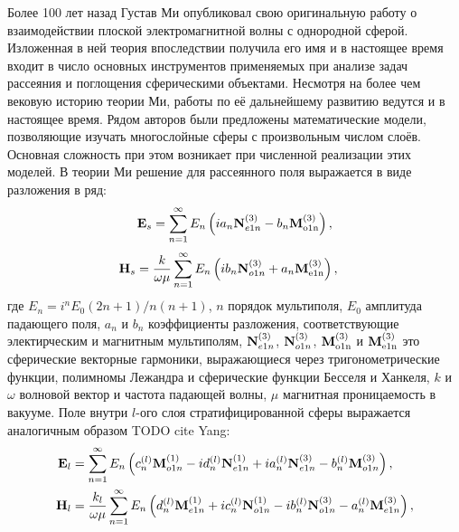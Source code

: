 Более 100 лет назад Густав Ми опубликовал свою оригинальную работу о
взаимодействии плоской электромагнитной волны с однородной сферой.
Изложенная в ней теория впоследствии получила его имя и в настоящее
время входит в число основных инструментов применяемых при анализе
задач рассеяния и поглощения сферическими объектами.  Несмотря на
более чем вековую историю теории Ми, работы по её дальнейшему развитию
ведутся и в настоящее время.  Рядом авторов были предложены
математические модели, позволяющие изучать многослойные сферы с
произвольным числом слоёв.  Основная сложность при этом возникает при
численной реализации этих моделей.  В теории Ми решение для
рассеянного поля выражается в виде разложения в ряд:
\begin{align*}
{\rm \mathbf{E}}_s &=\sum_{n=1}^{\infty} E_n \left( i a_n {\rm
    \mathbf{N}}_{e1n}^{(3)} - b_n{\rm\mathbf{M}_{o1n}^{(3)}} \right),\\
\end{align*}
\begin{align*}
{\rm \mathbf{H}}_s &=\frac{k}{\omega\mu}
 \sum_{n=1}^{\infty} E_n \left( i b_n {\rm
    \mathbf{N}}_{o1n}^{(3)} + a_n{\rm\mathbf{M}_{e1n}^{(3)}} \right),  
\end{align*}
где $E_n=i^nE_0(2n+1)/n(n+1)$, $n$ порядок мультиполя, $E_0$ амплитуда
падающего поля, $a_n$ и $b_n$ коэффициенты разложения, соответствующие
электирческим и магнитным мультиполям, ${\rm \mathbf{N}}_{e1n}^{(3)}$,
${\rm \mathbf{N}}_{o1n}^{(3)}$, ${\rm\mathbf{M}_{o1n}^{(3)}}$ и
${\rm\mathbf{M}_{e1n}^{(3)}}$ это сферические векторные гармоники,
выражающиеся через тригонометрические функции, полимномы Лежандра и
сферические функции Бесселя и Ханкеля, $k$ и $\omega$ волновой вектор
и частота падающей волны, $\mu$ магнитная проницаемость в вакууме.
Поле внутри $l$-ого слоя стратифицированной сферы выражается
аналогичным образом TODO cite Yang:
\begin{align*}
{\rm \mathbf{E}}_l &=\sum_{n=1}^{\infty} E_n \left(
                     c_n^{(l)}{\rm\mathbf{M}}_{o1n}^{(1)}
                     -i d_n^{(l)} {\rm \mathbf{N}}_{e1n}^{(1)}
                     +i a_n^{(l)} {\rm \mathbf{N}}_{e1n}^{(3)}
                     - b_n^{(l)}{\rm\mathbf{M}}_{o1n}^{(3)} 
                     \right),\\
{\rm \mathbf{H}}_l &=\frac{k_l}{\omega\mu} \sum_{n=1}^{\infty} E_n
                     \left(
                      d_n^{(l)}{\rm\mathbf{M}}_{e1n}^{(1)} 
                     +i c_n^{(l)} {\rm \mathbf{N}}_{o1n}^{(1)} 
                     -i b_n^{(l)} {\rm \mathbf{N}}_{o1n}^{(3)} 
                     - a_n^{(l)}{\rm\mathbf{M}}_{e1n}^{(3)} 
                     \right),  
\end{align*}
